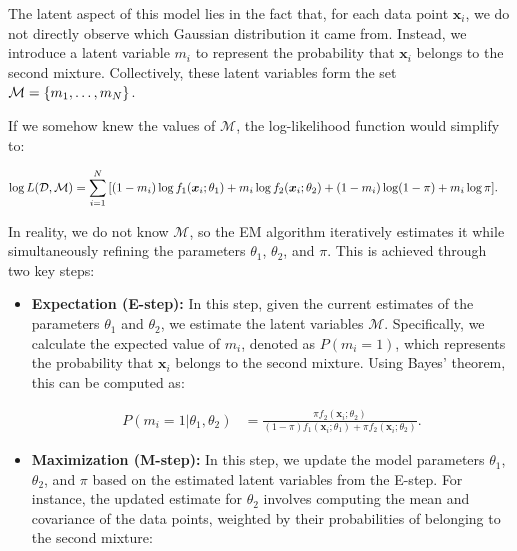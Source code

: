 {The latent aspect of this model lies in the fact that, for each data point \(\bm{x}_i\), we do not directly observe which Gaussian distribution it came from. Instead, we introduce a latent variable \(m_i\) to represent the probability that \(\bm{x}_i\) belongs to the second mixture. Collectively, these latent variables form the set \(\mathcal{M} = \{m_1, \ldots, m_N\}\).

If we somehow knew the values of \(\mathcal{M}\), the log-likelihood function would simplify to:

\begin{equation}
    \begin{aligned}
    \log L(\mathcal{D}, \mathcal{M}) & = \sum_{i=1}^{N}{
        \left[
            (1 - m_i) \log f_1(\bm{x}_i; \theta_1) + m_i  \log f_2(\bm{x}_i; \theta_2) + 
            (1 - m_i) \log(1 - \pi) + m_i \log\pi
        \right]
    }.
    \end{aligned}
\end{equation}

In reality, we do not know \(\mathcal{M}\), so the EM algorithm iteratively estimates it while simultaneously refining the parameters \(\theta_1\), \(\theta_2\), and \(\pi\). This is achieved through two key steps:

\begin{itemize}
    \item \textbf{Expectation (E-step):} In this step, given the current estimates of the parameters \(\theta_1\) and \(\theta_2\), we estimate the latent variables \(\mathcal{M}\). Specifically, we calculate the expected value of \(m_i\), denoted as \(P(m_i=1)\), which represents the probability that \(\bm{x}_i\) belongs to the second mixture. Using Bayes' theorem, this can be computed as:

    \begin{equation}
        \begin{aligned}
        P(m_i=1 | \theta_1, \theta_2) & = \frac{\pi f_2(\bm{x}_i; \theta_2)}{(1-\pi)f_1(\bm{x}_i; \theta_1) + \pi f_2(\bm{x}_i; \theta_2)}.
        \end{aligned}
    \end{equation}

    \item \textbf{Maximization (M-step):} In this step, we update the model parameters \(\theta_1\), \(\theta_2\), and \(\pi\) based on the estimated latent variables from the E-step. For instance, the updated estimate for \(\theta_2\) involves computing the mean and covariance of the data points, weighted by their probabilities of belonging to the second mixture:


\end{itemize}}
